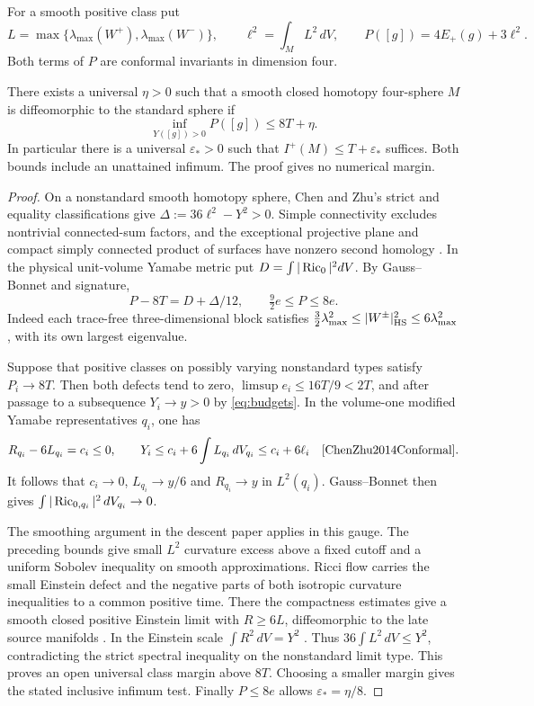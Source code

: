 For a smooth positive class put
\[
 L=\max\{\lambda_{\max}(W^+),\lambda_{\max}(W^-)\},\qquad
 \ell^2=\int_M L^2\,dV,\qquad P([g])=4E_+(g)+3\ell^2 .
\]
Both terms of \(P\) are conformal invariants in dimension four.

\begin{theorem}\label{thm:recognition-gap}
There exists a universal \(\eta>0\) such that a smooth closed
homotopy four-sphere \(M\) is diffeomorphic to the standard sphere if
\[
   \inf_{Y([g])>0} P([g])\le 8T+\eta .
\]
In particular there is a universal \(\varepsilon_*>0\) such that
\(I^+(M)\le T+\varepsilon_*\) suffices. Both bounds include an
unattained infimum. The proof gives no numerical margin.
\end{theorem}

\begin{proof}
On a nonstandard smooth homotopy sphere, Chen and Zhu's strict
and equality classifications give \(\Delta:=36\ell^2-Y^2>0\).
Simple connectivity excludes nontrivial connected-sum factors,
and the exceptional projective plane and compact simply connected
product of surfaces have nonzero second homology
\cite[Theorems 1.4 and 1.6]{ChenZhu2014Conformal}. In the physical
unit-volume Yamabe metric put \(D=\int|\operatorname{Ric}_0|^2dV\). By
Gauss--Bonnet and signature,
\[
             P-8T=D+\Delta/12,\qquad \tfrac92 e\le P\le8e .
\]
Indeed each trace-free three-dimensional block satisfies
\(\tfrac32\lambda_{\max}^2\le |W^\pm|^2_{\rm HS}
\le6\lambda_{\max}^2\), with its own largest eigenvalue.

Suppose that positive classes on possibly varying nonstandard types
satisfy \(P_i\to8T\). Then both defects tend to zero,
\(\limsup e_i\le16T/9<2T\), and after passage to a subsequence
\(Y_i\to y>0\) by \eqref{eq:budgets}. In the volume-one modified
Yamabe representatives \(q_i\), one has
\[
 R_{q_i}-6L_{q_i}=c_i\le0,\qquad
 Y_i\le c_i+6\int L_{q_i}\,dV_{q_i}\le c_i+6\ell_i
 \quad\cite[Lemma 2.1 and Theorem 1.7]{ChenZhu2014Conformal}.
\]
It follows that \(c_i\to0\), \(L_{q_i}\to y/6\) and \(R_{q_i}\to y\)
in \(L^2(q_i)\). Gauss--Bonnet then gives
\(\int|\operatorname{Ric}_{0,q_i}|^2\,dV_{q_i}\to0\).

The smoothing argument in the descent paper applies in this gauge.
The preceding bounds give small \(L^2\) curvature excess above a
fixed cutoff and a uniform Sobolev inequality on smooth approximations.
Ricci flow carries the small Einstein defect and the negative parts of
both isotropic curvature inequalities to a common positive time.
There the compactness estimates give a smooth closed positive Einstein
limit with \(R\ge6L\), diffeomorphic to the late source manifolds
\cite[Smoothing from a small curvature excess and Recognition with a
spectral term]{Baker2026FixedDescent}. In the Einstein scale
\(\int R^2\,dV=Y^2\) \cite{Obata1962Sphere,AkutagawaEndoSeshadri2019Gap}.
Thus \(36\int L^2\,dV\le Y^2\), contradicting the strict spectral
inequality on the nonstandard limit type. This proves an open
universal class margin above \(8T\). Choosing a smaller margin
gives the stated inclusive infimum test. Finally \(P\le8e\)
allows \(\varepsilon_*=\eta/8\).
\end{proof}
